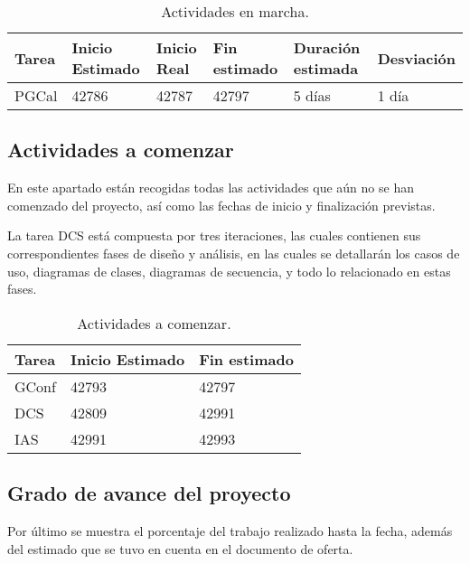 \begin{table}[h]
\begin{center}
\begin{tabular}{ l l l l l l}
\hline
	Tarea & Inicio Estimado & Inicio Real & Fin estimado & Duración estimada & Desviación \\ \hline \hline
	PGCal & 42786 & 42787 & 42797 & 5 días & 1 día \\ \hline
\end{tabular}
\caption{Actividades en marcha.}
\label{tab:Actividades en marcha}
\end{center}
\end{table}


\subsection{Actividades a comenzar}
\par En este apartado están recogidas todas las actividades que aún no se han comenzado del proyecto, así como las fechas de inicio y finalización previstas.
\par La tarea DCS está compuesta por tres iteraciones, las cuales contienen sus correspondientes fases de diseño y análisis, en las cuales se detallarán los casos de uso, diagramas de clases, diagramas de secuencia, y todo lo relacionado en estas fases.

\begin{table}[H]
\begin{center}
\begin{tabular}{ l l l}
\hline
	Tarea & Inicio Estimado & Fin estimado \\ \hline \hline
	GConf & 42793 & 42797 \\ \hline
	DCS & 42809 & 42991 \\ \hline
	IAS & 42991 & 42993 \\ \hline
\end{tabular}
\caption{Actividades a comenzar.}
\label{tab:Actividades a comenzar}
\end{center}
\end{table}

\subsection{Grado de avance del proyecto}
\par Por último se muestra el porcentaje del trabajo realizado hasta la fecha, además del estimado que se tuvo en cuenta en el documento de oferta.

